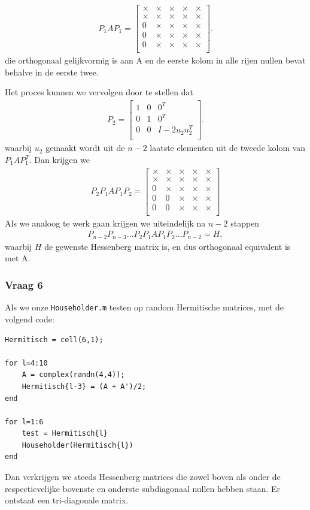 \documentclass{article}
\begin{document}
\begin{align*}
    P_1AP_1=
    \begin{bmatrix}
    \times & \times & \times & \times & \times\\
    \times & \times & \times & \times & \times\\
    0 & \times & \times & \times & \times\\
    0 & \times & \times & \times & \times\\
    0 & \times & \times & \times & \times\\
    \end{bmatrix}.
\end{align*}
die orthogonaal gelijkvormig is aan A en de eerste kolom in alle rijen nullen bevat behalve in de eerste twee.

Het proces kunnen we vervolgen door te stellen dat 
\begin{align*}
    P_2=\begin{bmatrix}
    1 & 0 & 0^T\\
    0 & 1 & 0^T\\
    0 & 0 & I-2u_2 u_2^T\\
    \end{bmatrix}.
\end{align*}
waarbij $u_2$ gemaakt wordt uit de $n-2$ laatste elementen uit de tweede kolom van $P_1AP_1^T$. Dan krijgen we 
\begin{align*}
    P_2P_1AP_1P_2=
    \begin{bmatrix}
    \times & \times & \times & \times & \times\\
    \times & \times & \times & \times & \times\\
    0 & \times & \times & \times & \times\\
    0 & 0 & \times & \times & \times\\
    0 & 0 & \times & \times & \times\\
    \end{bmatrix}
\end{align*}
Als we analoog te werk gaan krijgen we uiteindelijk na $n-2$ stappen
\begin{align*}
    P_{n-2}P_{n-3}\dots P_2P_1AP_1P_2\dots P_{n-2}=H,
\end{align*}
waarbij $H$ de gewenste Hessenberg matrix is, en dus orthogonaal equivalent is met A.

\subsubsection*{Vraag 6}%
Als we onze \texttt{Householder.m} testen op random Hermitische matrices, met de volgend code:
\vspace{-5mm}
\begin{lstlisting}
Hermitisch = cell(6,1);

for l=4:10
    A = complex(randn(4,4));
    Hermitisch{l-3} = (A + A')/2;
end

for l=1:6
    test = Hermitisch{l}
    Householder(Hermitisch{l})
end
\end{lstlisting}
Dan verkrijgen we steeds Hessenberg matrices die zowel boven als onder de respectievelijke bovenste en onderste subdiagonaal nullen hebben staan. Er ontstaat een tri-diagonale matrix.
\end{document}
